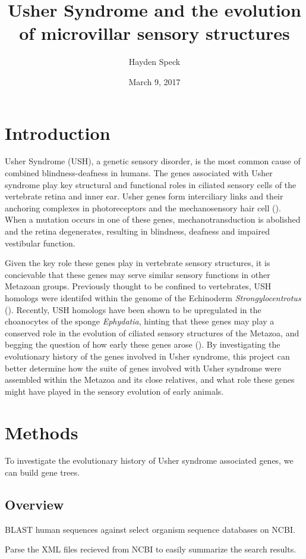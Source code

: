 \documentclass[12pt]{article}
\title{Usher Syndrome and the evolution of microvillar sensory structures}
\author{Hayden Speck}
\date{March 9, 2017}
\begin{document}
\maketitle
\section{Introduction}
Usher Syndrome (USH), a genetic sensory disorder, is the most common cause of combined blindness-deafness in humans.  The genes associated with Usher syndrome play key structural and functional roles in ciliated sensory cells of the vertebrate retina and inner ear.  Usher genes form interciliary links and their anchoring complexes in photoreceptors and the mechanosensory hair cell (\cite{Kremer2006}).  When a mutation occurs in one of these genes,  mechanotransduction is abolished and the retina degenerates, resulting in blindness, deafness and impaired vestibular function.  

Given the key role these genes play in vertebrate sensory structures, it is concievable that these genes may serve similar sensory functions in other Metazoan groups.   Previously thought to be confined to vertebrates, USH homologs were identifed within the genome of the Echinoderm \textit{Strongylocentrotus} (\cite{Sodergren2006}).  Recently, USH homologs have been shown to be upregulated in the choanocytes of the sponge \textit{Ephydatia}, hinting that these genes may play a conserved role in the evolution of ciliated sensory structures of the Metazoa, and begging the question of how early these genes arose (\cite{Pena2016}).  By investigating the evolutionary history of the genes involved in Usher syndrome, this project can better determine how the suite of genes involved with Usher syndrome were assembled within the Metazoa and its close relatives, and what role these genes might have played in the sensory evolution of early animals.
\section{Methods}
To investigate the evolutionary history of Usher syndrome associated genes, we can build gene trees.

\subsection{Overview}

BLAST human sequences against select organism sequence databases on NCBI.

Parse the XML files recieved from NCBI to easily summarize the search results.
\end{document}
